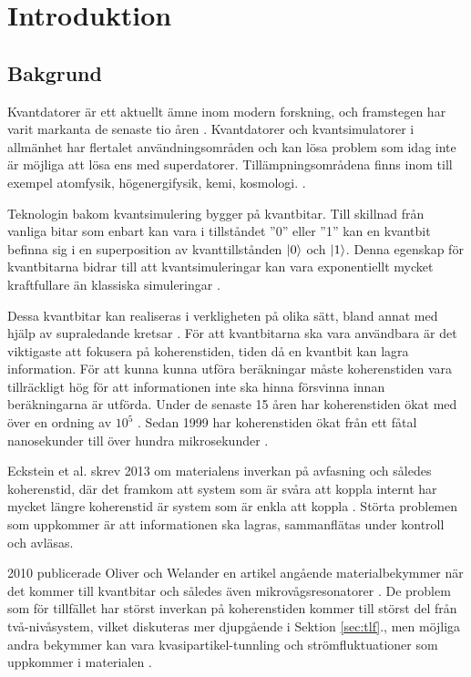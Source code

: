 \documentclass[main.tex]{subfiles}
\begin{document}
\chapter{Introduktion}
\section{Bakgrund}
Kvantdatorer är ett aktuellt ämne inom modern forskning, och framstegen har varit markanta de senaste tio åren \autocite{Bylander2017}. Kvantdatorer och kvantsimulatorer i allmänhet har flertalet användningsområden och kan lösa problem som idag inte är möjliga att lösa ens med superdatorer. Tillämpningsområdena finns inom till exempel atomfysik, högenergifysik, kemi, kosmologi. \cite{applications}.


Teknologin bakom kvantsimulering bygger på kvantbitar. Till skillnad från vanliga bitar som enbart kan vara i tillståndet ''0'' eller ''1'' kan en kvantbit befinna sig i en superposition av kvanttillstånden $\ket{0}$ och $\ket{1}$. Denna egenskap för kvantbitarna bidrar till att kvantsimuleringar kan vara exponentiellt mycket kraftfullare än klassiska simuleringar \cite{Eckstein2013}.

Dessa kvantbitar kan realiseras i verkligheten på olika sätt, bland annat med hjälp av supraledande kretsar \cite{Oliver2013}. För att kvantbitarna ska vara användbara är det viktigaste att fokusera på koherenstiden, tiden då en kvantbit kan lagra information. För att kunna kunna utföra beräkningar måste koherenstiden vara tillräckligt hög för att informationen inte ska hinna försvinna innan beräkningarna är utförda\cite{Eckstein2013}. Under de senaste 15 åren har koherenstiden ökat med över en ordning av $10^5$ \cite{Oliver2013}.
 Sedan 1999 har koherenstiden ökat från ett fåtal nanosekunder till över hundra mikrosekunder \cite{Wendin2016}.

Eckstein et al. skrev 2013 om materialens inverkan på avfasning och således koherenstid, där det framkom att system som är svåra att koppla internt har mycket längre koherenstid är system som är enkla att koppla \cite{Eckstein2013}. Störta problemen som uppkommer är att informationen ska lagras, sammanflätas under kontroll och avläsas.

2010 publicerade Oliver och Welander en artikel angående materialbekymmer när det kommer till kvantbitar och således även mikrovågsresonatorer \cite{Oliver2013
}. De problem som för tillfället har störst inverkan på koherenstiden kommer till störst del från två-nivåsystem, vilket diskuteras mer djupgående i Sektion \ref{sec:tlf}., men möjliga andra bekymmer kan vara kvasipartikel-tunnling och strömfluktuationer som uppkommer i materialen \cite{Oliver2013}.
\end{document}
